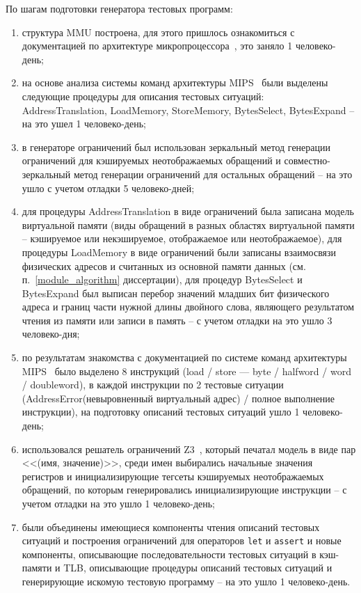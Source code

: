 \documentclass[14pt]{extreport}
\begin{document}
По шагам подготовки генератора тестовых программ:
\begin{enumerate}
  \item\label{step_mmu} структура MMU построена, для этого пришлось ознакомиться с
  документацией по архитектуре микропроцессора~\cite{mips64_III},
  это заняло 1 человеко-день;
  \item\label{step_procedures}
  на основе анализа системы команд архитектуры MIPS~\cite{mips64_II}
  были выделены следующие процедуры для описания тестовых
  ситуаций:\\
  AddressTranslation, LoadMemory, StoreMemory, BytesSelect,
  BytesExpand -- на это ушел 1 человеко-день;
  \item в генераторе ограничений был использован зеркальный метод
  генерации ограничений для кэшируемых неотображаемых обращений и
  совместно-зеркальный метод генерации ограничений для остальных
  обращений -- на это ушло с учетом отладки 5 человеко-дней;
  \item для процедуры AddressTranslation в виде ограничений была
  записана модель виртуальной памяти (виды обращений в разных
  областях виртуальной памяти -- кэшируемое или некэшируемое,
  отображаемое или неотображаемое), для процедуры LoadMemory в виде
  ограничений были записаны взаимосвязи физических адресов и
  считанных из основной памяти данных (см.
  п.~\ref{module_algorithm} диссертации), для процедур BytesSelect и
  BytesExpand был выписан перебор значений младших бит физического
  адреса и границ части нужной длины двойного слова, являющего
  результатом чтения из памяти или записи в память -- с учетом
  отладки на это ушло 3 человеко-дня;
  \item\label{step_testsituations}
   по результатам знакомства с документацией по системе команд
  архитектуры MIPS~\cite{mips64_II} было выделено 8 инструкций
  (load / store --- byte / halfword / word / doubleword), в каждой инструкции по
  2 тестовые ситуации (AddressError(невыровненный виртуальный
  адрес) / полное выполнение инструкции), на подготовку описаний
  тестовых ситуаций ушло 1 человеко-день;
  \item\label{step_z3} использовался решатель ограничений Z3~\cite{Z3}, который
  печатал модель в виде пар <<(имя, значение)>>, среди имен
  выбирались начальные значения регистров и инициализирующие тегсеты
  кэшируемых неотображаемых обращений, по которым генерировались
  инициализирующие инструкции -- с учетом отладки на это ушло 1
  человеко-день;
  \item\label{step_compose} были объединены имеющиеся компоненты чтения описаний
  тестовых ситуаций и построения ограничений для операторов
  \texttt{let} и \texttt{assert} и новые компоненты, описывающие
  последовательности тестовых ситуаций в кэш-памяти и TLB,
  описывающие процедуры описаний тестовых ситуаций и генерирующие
  искомую тестовую программу -- на это ушло 1 человеко-день.
\end{enumerate}
\end{document}
